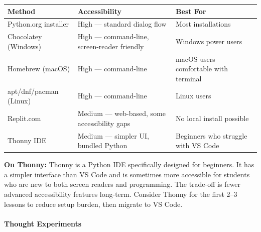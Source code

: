 \documentclass[
  justified,
  openright,
]{tufte-book}
\let\paragraph\paragraph
\let\paragraph\paragraph
\begin{document}
{\def\LTcaptype{none} %
\begin{longtable}[]{@{}
  >{\raggedright\arraybackslash}p{}
  >{\raggedright\arraybackslash}p{}
  >{\raggedright\arraybackslash}p{}@{}}
\toprule\noalign{}
\begin{minipage}[b]{\linewidth}\raggedright
Method
\end{minipage} & \begin{minipage}[b]{\linewidth}\raggedright
Accessibility
\end{minipage} & \begin{minipage}[b]{\linewidth}\raggedright
Best For
\end{minipage} \\
\midrule\noalign{}
\endhead
\bottomrule\noalign{}
\endlastfoot
Python.org installer & High --- standard dialog flow & Most
installations \\
Chocolatey (Windows) & High --- command-line, screen-reader friendly &
Windows power users \\
Homebrew (macOS) & High --- command-line & macOS users comfortable with
terminal \\
apt/dnf/pacman (Linux) & High --- command-line & Linux users \\
Replit.com & Medium --- web-based, some accessibility gaps & No local
install possible \\
Thonny IDE & Medium --- simpler UI, bundled Python & Beginners who
struggle with VS Code \\
\end{longtable}
}

\textbf{On Thonny:} Thonny is a Python IDE specifically designed for
beginners. It has a simpler interface than VS Code and is sometimes more
accessible for students who are new to both screen readers and
programming. The trade-off is fewer advanced accessibility features
long-term. Consider Thonny for the first 2--3 lessons to reduce setup
burden, then migrate to VS Code.

\paragraph{Thought Experiments}\label{thought-experiments}
\end{document}
